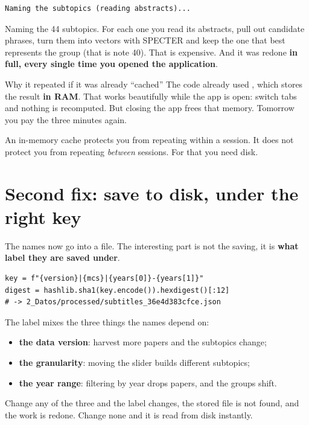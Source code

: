 \documentclass[11pt,a4paper]{article}
\begin{document}
\begin{verbatim}
Naming the subtopics (reading abstracts)...
\end{verbatim}

Naming the 44 subtopics. For each one you read its abstracts, pull out candidate phrases,
turn them into vectors with SPECTER and keep the one that best represents the group (that
is note 40). That is expensive. And it was redone \textbf{in full, every single time you
opened the application}.

\begin{concepto}{Why it repeated if it was already ``cached''}
The code already used , which stores the result \textbf{in RAM}.
That works beautifully while the app is open: switch tabs and nothing is recomputed. But
closing the app frees that memory. Tomorrow you pay the three minutes again.

An in-memory cache protects you from repeating within a session. It does not protect you
from repeating \emph{between} sessions. For that you need disk.
\end{concepto}

\section{Second fix: save to disk, under the right key}

The names now go into a  file. The interesting part is not the saving, it
is \textbf{what label they are saved under}.

\begin{verbatim}
key = f"{version}|{mcs}|{years[0]}-{years[1]}"
digest = hashlib.sha1(key.encode()).hexdigest()[:12]
# -> 2_Datos/processed/subtitles_36e4d383cfce.json
\end{verbatim}

The label mixes the three things the names depend on:

\begin{itemize}
  \item \textbf{the data version}: harvest more papers and the subtopics change;
  \item \textbf{the granularity}: moving the slider builds different subtopics;
  \item \textbf{the year range}: filtering by year drops papers, and the groups shift.
\end{itemize}

Change any of the three and the label changes, the stored file is not found, and the work
is redone. Change none and it is read from disk instantly.
\end{document}

